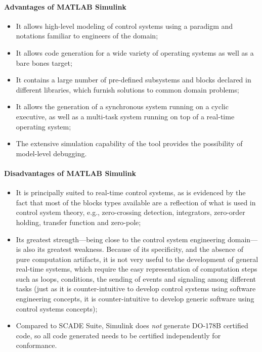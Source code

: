 \paragraph{Advantages of MATLAB Simulink}
\begin{itemize}
\item{It allows high-level modeling of control systems using a
  paradigm and notations familiar to engineers of the domain;}
\item{It allows code generation for a wide variety of operating
  systems as well as a bare bones target;}
\item{It contains a large number of pre-defined subsystems and blocks
  declared in different libraries, which furnish solutions to common
  domain problems;}
\item{It allows the generation of a synchronous system running on a
  cyclic executive, as well as a multi-task system running on top of a
  real-time operating system;}
\item{The extensive simulation capability of the tool provides the
  possibility of model-level debugging.}
\end{itemize}

\paragraph{Disadvantages of MATLAB Simulink}
\begin{itemize}
\item{It is principally suited to real-time control systems, as is
  evidenced by the fact that most of the blocks types available are a
  reflection of what is used in control system theory, e.g.,
  zero-crossing detection, integrators, zero-order holding, transfer
  function and zero-pole;}
\item{Its greatest strength---being close to the control system
  engineering domain---is also its greatest weakness. Because of its
  specificity, and the absence of pure computation artifacts, it is
  not very useful to the development of general real-time systems,
  which require the easy representation of computation steps such as
  loops, conditions, the sending of events and signaling among
  different tasks (just as it is counter-intuitive to develop control
  systems using software engineering concepts, it is counter-intuitive
  to develop generic software using control systems concepts);}
\item{Compared to SCADE Suite, Simulink does \emph{not} generate
  DO-178B certified code, so all code generated needs to be certified
  independently for conformance.}
\end{itemize}

